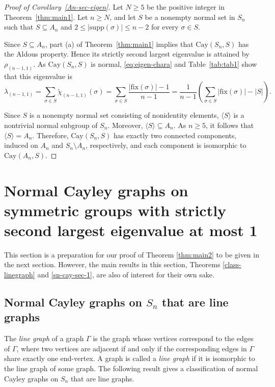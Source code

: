 \documentclass[12pt, a4paper]{article}
\def\fix{\mathrm{fix}}
\theoremstyle{definition}
\begin{document}
\begin{proof}[Proof of Corollary~\ref{An-sec-eigen}]
Let $N \ge 5$ be the positive integer in Theorem~\ref{thm:main1}. Let $n\geq N$, and let $S$ be a nonempty normal set in $S_n$ such that $S\subseteq A_n$ and $2\leq |\mathrm{supp}(\sigma)|\leq n-2$ for every $\sigma\in S$.

Since $S\subseteq A_n$, part (a) of Theorem~\ref{thm:main1} implies that $\mathrm{Cay}(S_n,S)$ has the Aldous property. Hence its strictly second largest eigenvalue is attained by $\rho_{(n-1,1)}$. As $\mathrm{Cay}(S_n,S)$ is normal, \eqref{eq:eigen-chara} and Table~\ref{tab:tab1} show that this eigenvalue is
\[
\lambda_{(n-1,1)}
=
\sum_{\sigma \in S} \tilde{\chi}_{(n-1,1)}(\sigma)
=
\sum_{\sigma \in S} \frac{|\fix(\sigma)|-1}{n-1}
=
\frac{1}{n-1} \left( \sum_{\sigma \in S} |\fix(\sigma)| - |S| \right).
\]

Since $S$ is a nonempty normal set consisting of nonidentity elements, $\langle S\rangle$ is a nontrivial normal subgroup of $S_n$. Moreover, $\langle S\rangle\subseteq A_n$. As $n\geq 5$, it follows that $\langle S\rangle=A_n$. Therefore, $\mathrm{Cay}(S_n,S)$ has exactly two connected components, induced on $A_n$ and $S_n\setminus A_n$, respectively, and each component is isomorphic to $\mathrm{Cay}(A_n,S)$.
\end{proof}


\section{Normal Cayley graphs on symmetric groups with strictly second largest eigenvalue at most 1}\label{line-graph}


This section is a preparation for our proof of Theorem \ref{thm:main2} to be given in the next section. However, the main results in this section, Theorems \ref{class-linegraph} and \ref{sn-cay-sec-1}, are also of interest for their own sake. 

\subsection{Normal Cayley graphs on $S_n$ that are line graphs}

The \emph{line graph} of a graph $\Gamma$ is the graph whose vertices correspond to the edges of $\Gamma$, where two vertices are adjacent if and only if the corresponding edges in $\Gamma$ share exactly one end-vertex. A graph is called a \emph{line graph} if it is isomorphic to the line graph of some graph. The following result gives a classification of normal Cayley graphs on $S_n$ that are line graphs. 
\end{document}

